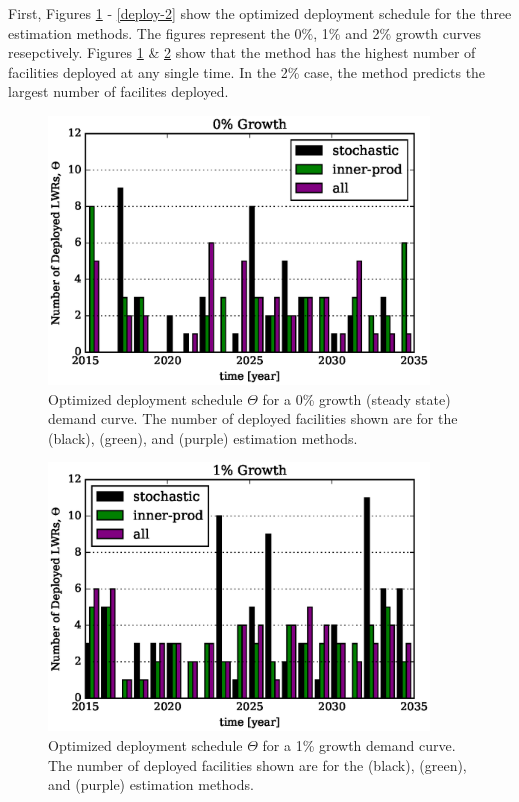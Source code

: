 First, Figures \ref{deploy-0} - \ref{deploy-2}
show the optimized deployment schedule for the three estimation methods.
The figures represent the 0\%, 1\% and 2\% growth curves resepctively.
Figures \ref{deploy-0} \& \ref{deploy-1} show that the \stochastic method
has the highest number of facilities deployed at any single time. In the 
2\% case, the \allflag method predicts the largest number of facilites 
deployed.

\begin{figure}[htb]
\centering
\includegraphics[width=0.9\textwidth]{deploy-0.eps}
\caption{Optimized deployment schedule $\Theta$ for a 0\% growth (steady 
state) demand curve. The number of deployed facilities shown are 
for the \stochastic (black), \innerprod (green), and \allflag (purple)
estimation methods.}
\label{deploy-0}
\end{figure}

\begin{figure}[htb]
\centering
\includegraphics[width=0.9\textwidth]{deploy-1.eps}
\caption{Optimized deployment schedule $\Theta$ for a 1\% growth 
demand curve. The number of deployed facilities shown are 
for the \stochastic (black), \innerprod (green), and \allflag (purple)
estimation methods.}
\label{deploy-1}
\end{figure}

